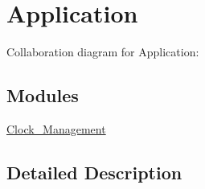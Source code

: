 \hypertarget{group___application}{}\section{Application}
\label{group___application}
Collaboration diagram for Application\+:
\subsection*{Modules}
\begin{DoxyCompactItemize}
\item 
\hyperlink{group___clock___management}{Clock\+\_\+\+Management}
\end{DoxyCompactItemize}


\subsection{Detailed Description}
